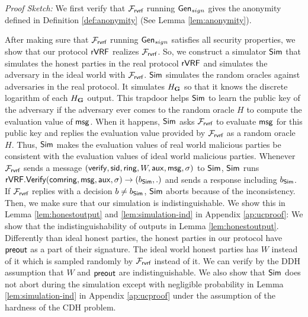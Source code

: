 \noindent \textit{Proof Sketch:} We first verify that $ \mathcal{F}_{\textsf{rvrf}} $ running $ \mathsf{Gen}_{sign} $ gives the anonymity defined in Definition \ref{def:anonymity} (See Lemma \ref{lem:anonymity}). 

After making sure that $ \mathcal{F}_{\textsf{rvrf}} $ running $ \mathsf{Gen}_{sign} $ satisfies all security properties, we show that our protocol $ {\mathsf{rVRF}} $ realizes $ \mathcal{F}_{\textsf{rvrf}} $. So, we construct a simulator $ \mathsf{Sim} $ that simulates the honest parties in the real protocol $ {\mathsf{rVRF}} $ and simulates the adversary in the ideal world with $ \mathcal{F}_{\textsf{rvrf}} $. $ \mathsf{Sim} $ simulates the random oracles against adversaries in the real protocol. It simulates $H_{\mathbf{G}} $ so that it knows the discrete logarithm of each $ H_{\mathbf{G}} $ output. This trapdoor helps $ \mathsf{Sim} $ to learn the public key of the adversary if the adversary ever comes to the random oracle $ H $ to compute the evaluation value of $ \mathsf{msg} $. When it happens, $ \mathsf{Sim} $ asks $ \mathcal{F}_{\textsf{rvrf}} $ to evaluate $ \mathsf{msg} $ for this public key and replies the evaluation value provided by $ \mathcal{F}_{\textsf{rvrf}} $ as a random oracle $ H $. Thus, $ \mathsf{Sim} $ makes the evaluation values of real world malicious parties be consistent with the evaluation values of ideal world malicious parties. Whenever $ \mathcal{F}_{\textsf{rvrf}} $ sends a message $ (\mathsf{verify}, \textsf{sid}, \mathsf{ring}, W, \mathsf{aux},\mathsf{msg}, \sigma) $ to $ \mathsf{Sim} $, $ \mathsf{Sim} $ runs $ {\mathsf{rVRF}}.{\mathsf{Verify}}(\mathsf{comring}, \mathsf{msg},\mathsf{aux},\sigma) \rightarrow (b_{\mathsf{Sim}},.)$ and sends a response including $ b_{\mathsf{Sim}} $. If $ \mathcal{F}_{\textsf{rvrf}} $ replies with a decision $ b \neq b_{\mathsf{Sim}} $, $ \mathsf{Sim} $ aborts because of the inconsistency. Then, we  make sure that our simulation is indistinguishable. We show this in Lemma \ref{lem:honestoutput} and \ref{lem:simulation-ind} in Appendix \ref{ap:ucproof}:
We  show that the indistinguishability of outputs in Lemma \ref{lem:honestoutput}. Differently than ideal honest parties, the honest parties in our  protocol have $ {\mathsf{preout}} $ as a part of their signature. The ideal world honest parties has $ W $ instead of it which is sampled randomly by $ \mathcal{F}_{\textsf{rvrf}} $ instead of it. We can verify by the DDH assumption that $ W $ and $ {\mathsf{preout}} $ are indistinguishable.
We also show that $ \mathsf{Sim} $ does not abort during the simulation except with negligible probability in Lemma \ref{lem:simulation-ind} in Appendix \ref{ap:ucproof} under the assumption of the hardness of the CDH problem. 


 




\endinput
